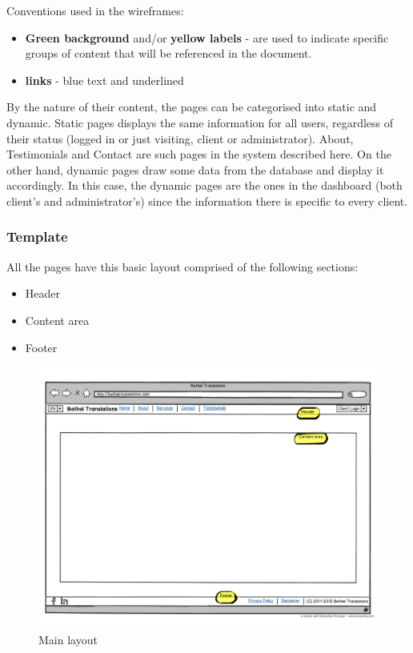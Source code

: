 \documentclass{l3proj}
\begin{document}
Conventions used in the wireframes:
\begin{itemize} \itemsep1pt \parskip0pt 
	\item \textbf{Green background} and/or \textbf{yellow labels} - are used to
	indicate specific groups of content that will be referenced in the document.
	\item \textbf{links} - blue text and underlined
\end{itemize}

By the nature of their content, the pages can be categorised into static and
dynamic. Static pages displays the same information for all users, regardless of
their status (logged in or just visiting, client or administrator). About,
Testimonials and Contact are such pages in the system described here. On the
other hand, dynamic pages draw some data from the database and display it
accordingly. In this case, the dynamic pages are the ones in the dashboard
(both client’s and administrator’s) since the information there is specific to
every client.



\subsubsection*{Template}
All the pages have this basic layout comprised of the following sections:
\begin{itemize} \itemsep1pt \parskip0pt 
	\item Header
	\item Content area
	\item Footer
\end{itemize}

\begin{figure}
\centering
\includegraphics[width=\linewidth, trim = 0px 50px 0px 50px]
	{wireframes/main-layout}
\caption{Main layout}
\label{wireframes-main-layout}
\end{figure}
\end{document}
